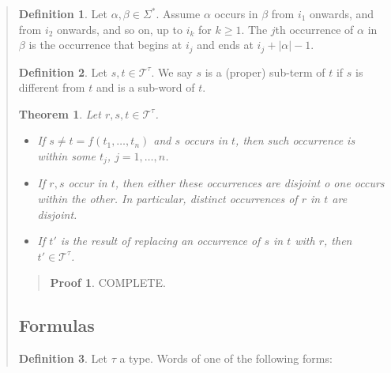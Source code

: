 \documentclass[a4paper, 12pt]{article}
\newtheorem{theorem}{Theorem}
\theoremstyle{definition}
\theoremstyle{definition}
\theoremstyle{definition}
\newtheorem{definition}{Definition}
\newtheorem{pro}{Proof}
\begin{document}
\begin{quote}
\begin{definition}
    Let $\alpha, \beta \in \Sigma^{*}$. Assume $\alpha$ occurs in $\beta$ from 
    $i_1$ onwards, and from $i_2$ onwards, and so on, up to 
    $i_k$ for $k \geq 1$. The $j$th occurrence of $\alpha$
    in $\beta$ is the occurrence that begins at 
    $i_j$ and ends at $i_j + |\alpha| - 1$.
\end{definition}

\begin{definition}
    Let $s, t \in \mathcal{T}^{\tau}$. We say $s$ is a (proper) sub-term of $t$ if $s$
    is different from $t$ and is a sub-word of $t$.
\end{definition}

\begin{theorem}
    Let $r, s, t \in \mathcal{T}^\tau$. 

    \begin{itemize}
        \item If $s \neq t = f(t_1, \ldots, t_n)$ and $s$ occurs in $t$, then such 
            occurrence is within some $t_j$, $j = 1, \ldots, n$.
        \item If $r, s$ occur in $t$, then either these occurrences are disjoint o one 
            occurs within the other. In particular, distinct occurrences of $r$
            in $t$ are disjoint. 
        \item If $t'$ is the result of replacing an occurrence of $s$ in $t$ with $r$,
            then $t' \in \mathcal{T}^\tau$.
    \end{itemize}
\end{theorem}


\small
\begin{quote}

\begin{pro}
    COMPLETE.
\end{pro}

\end{quote}
\normalsize

\subsection{Formulas}

\begin{definition}
    Let $\tau$ a type. Words of one of the following forms:


\end{definition}
\end{quote}
\end{document}
